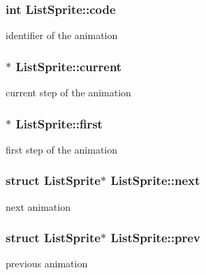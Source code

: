 \subsubsection[{\texorpdfstring{code}{code}}]{\setlength{\rightskip}{0pt plus 5cm}int List\+Sprite\+::code}\hypertarget{structListSprite_acf824bc4a786357423b4e697ab7e3c91}{}\label{structListSprite_acf824bc4a786357423b4e697ab7e3c91}
identifier of the animation 
\subsubsection[{\texorpdfstring{current}{current}}]{$\ast$ List\+Sprite\+::current}\hypertarget{structListSprite_a3b1ab9fe7a6593fbe2767e7b2a7f6676}{}\label{structListSprite_a3b1ab9fe7a6593fbe2767e7b2a7f6676}
current step of the animation 
\subsubsection[{\texorpdfstring{first}{first}}]{$\ast$ List\+Sprite\+::first}\hypertarget{structListSprite_ad9a0c4aba9987a7a50986cfe6713dd1e}{}\label{structListSprite_ad9a0c4aba9987a7a50986cfe6713dd1e}
first step of the animation 
\subsubsection[{\texorpdfstring{next}{next}}]{\setlength{\rightskip}{0pt plus 5cm}struct {\bf List\+Sprite}$\ast$ List\+Sprite\+::next}\hypertarget{structListSprite_a9a866f0341b7fad117cbf1d19e1cba9c}{}\label{structListSprite_a9a866f0341b7fad117cbf1d19e1cba9c}
next animation 
\subsubsection[{\texorpdfstring{prev}{prev}}]{\setlength{\rightskip}{0pt plus 5cm}struct {\bf List\+Sprite}$\ast$ List\+Sprite\+::prev}\hypertarget{structListSprite_a9ea0649f66bf1b779298adc3281ce8b8}{}\label{structListSprite_a9ea0649f66bf1b779298adc3281ce8b8}
previous animation 
